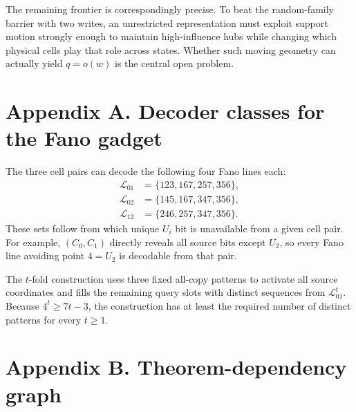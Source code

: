 \documentclass[
]{article}
\begin{document}
The remaining frontier is correspondingly precise. To beat the
random-family barrier with two writes, an unrestricted representation
must exploit support motion strongly enough to maintain high-influence
hubs while changing which physical cells play that role across states.
Whether such moving geometry can actually yield \(q=o(w)\) is the
central open problem.

\hypertarget{appendix-a.-decoder-classes-for-the-fano-gadget}{%
\section{Appendix A. Decoder classes for the Fano
gadget}\label{appendix-a.-decoder-classes-for-the-fano-gadget}}

The three cell pairs can decode the following four Fano lines each: \[
\begin{aligned}
\mathcal L_{01}&=\{123,167,257,356\},\\
\mathcal L_{02}&=\{145,167,347,356\},\\
\mathcal L_{12}&=\{246,257,347,356\}.
\end{aligned}
\] These sets follow from which unique \(U_i\) bit is unavailable from a
given cell pair. For example, \((C_0,C_1)\) directly reveals all source
bits except \(U_2\), so every Fano line avoiding point \(4=U_2\) is
decodable from that pair.

The \(t\)-fold construction uses three fixed all-copy patterns to
activate all source coordinates and fills the remaining query slots with
distinct sequences from \(\mathcal L_{01}^t\). Because \(4^t\ge7t-3\),
the construction has at least the required number of distinct patterns
for every \(t\ge1\).

\hypertarget{appendix-b.-theorem-dependency-graph}{%
\section{Appendix B. Theorem-dependency
graph}\label{appendix-b.-theorem-dependency-graph}}
\end{document}
